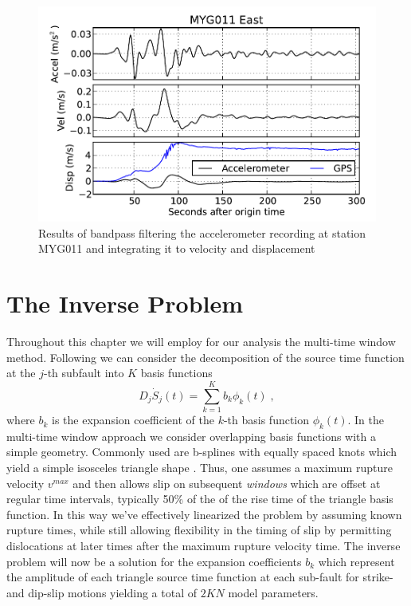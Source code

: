 \begin{figure}[!ht] 
  \centering
  \includegraphics[width=0.8\linewidth]{./figures/ch4/myg011_vel.pdf}
    \caption[Bandpass filtered waveforms for MYG011]{Results of bandpass filtering the accelerometer recording at station MYG011 and integrating it to velocity and displacement}
  \label{fig_myg011}
\end{figure}


\section{The Inverse Problem}

Throughout this chapter we will employ for our analysis the multi-time window method. Following \cite{ide1996} we can consider the decomposition of the source time function at the $j$-th subfault into $K$ basis functions
\begin{equation}
D_j\dot{S}_j(t)=\sum_{k=1}^Kb_k\phi_k(t)\;,
\end{equation}
where $b_k$ is the expansion coefficient of the $k$-th basis function $\phi_k(t)$. In the multi-time window approach we consider overlapping basis functions with a simple geometry. Commonly used are b-splines with equally spaced knots which yield a simple isosceles triangle shape \citep{ide1996,wu2001}. 
Thus, one assumes a maximum rupture velocity $v^{max}$ and then allows slip on subsequent \textit{windows}  which are offset at regular time intervals, typically 50\% of the of the rise time of the triangle basis function. In this way we've effectively linearized the problem by assuming known rupture times, while still allowing flexibility in the timing of slip by permitting dislocations at later times after the maximum rupture velocity time. The inverse problem will now be a solution for the expansion coefficients $b_k$ which represent the amplitude of each triangle source time function at each sub-fault for strike- and dip-slip motions yielding a total of $2KN$ model parameters.


